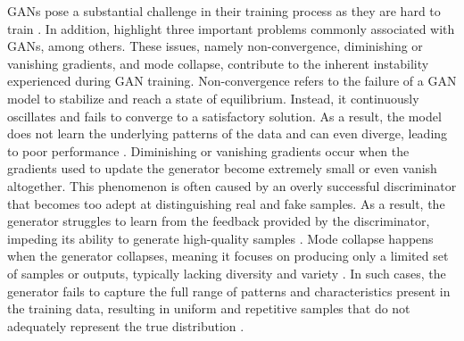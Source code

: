 GANs pose a substantial challenge in their training process as they are hard to train \citep{goodfellowGAN}. In addition, \citeauthor{brophyGAN} highlight three important problems commonly associated with GANs, among others. These issues, namely non-convergence, diminishing or vanishing gradients, and mode collapse, contribute to the inherent instability experienced during GAN training. Non-convergence refers to the failure of a GAN model to stabilize and reach a state of equilibrium. Instead, it continuously oscillates and fails to converge to a satisfactory solution. As a result, the model does not learn the underlying patterns of the data and can even diverge, leading to poor performance \citeauthor{brophyGAN}. Diminishing or vanishing gradients occur when the gradients used to update the generator become extremely small or even vanish altogether. This phenomenon is often caused by an overly successful discriminator that becomes too adept at distinguishing real and fake samples. As a result, the generator struggles to learn from the feedback provided by the discriminator, impeding its ability to generate high-quality samples \citeauthor{brophyGAN}. Mode collapse happens when the generator collapses, meaning it focuses on producing only a limited set of samples or outputs, typically lacking diversity and variety \citep{salimansNIPS}. In such cases, the generator fails to capture the full range of patterns and characteristics present in the training data, resulting in uniform and repetitive samples that do not adequately represent the true distribution \citeauthor{brophyGAN}.
